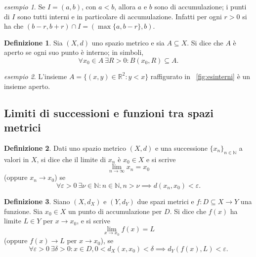 \documentclass[a4paper]{book}
\numberwithin{equation}{section}
\theoremstyle{plain}
\theoremstyle{definition}
\newtheorem{defn}{Definizione}[section]
\theoremstyle{remark}
\theoremstyle{example}
\newtheorem{exmp}{esempio}[section]
\begin{document}
\begin{exmp}
	Se $I = (a, b)$, con $a<b$, allora $a$ e $b$ sono di accumulazione; i punti di $I$ sono tutti interni e in particolare di accumulazione. Infatti per ogni $r > 0$ si ha che $(b-r, b+r) \cap I = (\max \{ a, b-r \}, b)$.
\end{exmp}

\begin{defn}
	Sia $(X, d)$ uno spazio metrico e sia $A \subseteq X$. Si dice che $A$ è aperto se ogni suo punto è interno; in simboli,
	\begin{equation*}
		\forall x_0 \in A \ \exists R > 0\colon B(x_0, R) \subseteq A.
	\end{equation*}
\end{defn}

\begin{exmp}
	L'insieme $A = \{(x, y) \in \mathbb{R}^2 \colon y < x \}$ raffigurato in \figurename~\ref{fig:esinterni} è un insieme aperto.
\end{exmp}

\subsection{Limiti di successioni e funzioni tra spazi metrici}
\begin{defn}
	Dati uno spazio metrico $(X, d)$ e una successione $\{x_n\}_{n\in \mathbb{N}}$ a valori in $X$, si dice che il limite di $x_n$ è $x_0 \in X$ e si scrive
	\begin{equation*}
		\lim _{n\to \infty} x_n = x_0
	\end{equation*}
	(oppure $x_n \to x_0$) se
	\begin{equation*}
		\forall \varepsilon > 0 \ \exists \nu \in \mathbb{N}\colon n \in \mathbb{N}, n > \nu \implies d(x_n, x_0) < \varepsilon.
	\end{equation*}
\end{defn}

\begin{defn}
	Siano $(X, d_X)$ e $(Y, d_Y)$ due spazi metrici e $f\colon D\subseteq X \to Y$ una funzione. Sia $x_0 \in X$ un punto di accumulazione per $D$. Si dice che $f(x)$ ha limite $L \in Y$ per $x \to x_0$, e si scrive
	\begin{equation*}
		\lim_{x\to x_0} f(x) = L
	\end{equation*}
	(oppure $ f(x) \to L$ per $x \to x_0$), se
	\begin{equation*}
		\forall \varepsilon > 0 \ \exists \delta > 0 \colon x \in D, 0 < d_X(x, x_0) < \delta \implies d_Y(f(x), L) < \varepsilon.
	\end{equation*}
\end{defn}
\end{document}
